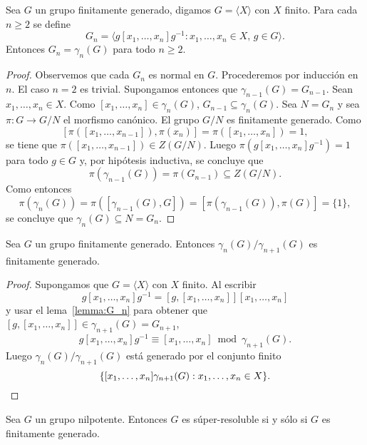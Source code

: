 \begin{lemma}
	\label{lemma:G_n}
	Sea $G$ un grupo finitamente generado, digamos $G=\langle X\rangle$ con $X$
	finito. Para cada $n\geq2$ se define
	\[
		G_n=\langle g[x_1,\dots,x_n]g^{-1}:x_1,\dots,x_n\in X,\,g\in G\rangle.
	\]
	Entonces $G_n=\gamma_n(G)$ para todo $n\geq2$. 
\end{lemma}

\begin{proof}
	Observemos que cada $G_n$ es normal en $G$.  Procederemos por inducción en
	$n$. El caso $n=2$ es trivial. Supongamos entonces que
	$\gamma_{n-1}(G)=G_{n-1}$. Sean $x_1,\dots,x_n\in X$. Como
	$[x_1,\dots,x_n]\in\gamma_{n}(G)$, $G_{n-1}\subseteq\gamma_n(G)$. Sea
	$N=G_n$ y sea $\pi\colon G\to G/N$ el morfismo canónico. El grupo $G/N$ es
	finitamente generado. Como
	\[
	[\pi([x_1,\dots,x_{n-1}]),\pi(x_n)]=\pi([x_1,\dots,x_n])=1,
	\]
	se tiene que $\pi([x_1,\dots,x_{n-1}])\in Z(G/N)$. Luego
	$\pi(g[x_1,\dots,x_n]g^{-1})=1$ para todo $g\in G$ y, por hipótesis
	inductiva, 
	se concluye que 
	\[
	\pi(\gamma_{n-1}(G))=\pi(G_{n-1})\subseteq Z(G/N).
	\]
	Como entonces 
	\[
	\pi(\gamma_{n}(G))=\pi([\gamma_{n-1}(G),G])=[\pi(\gamma_{n-1}(G)),\pi(G)]=\{1\},
	\]
	se concluye que $\gamma_n(G)\subseteq N=G_n$.
\end{proof}

\begin{lemma}
	\label{lemma:gamma_n/gamma_n+1}
	Sea $G$ un grupo finitamente generado.  Entonces
	$\gamma_n(G)/\gamma_{n+1}(G)$ es finitamente generado. 
\end{lemma}

\begin{proof}
	Supongamos que $G=\langle X\rangle$ con $X$ finito. 
	Al escribir 
	\[
	g[x_1,\dots,x_n]g^{-1}=[g,[x_1,\dots,x_n]][x_1,\dots,x_n]
	\]
	y usar el lema~\ref{lemma:G_n} para obtener 
	que $[g,[x_1,\dots,x_n]]\in \gamma_{n+1}(G)=G_{n+1}$, 
	\[
	g[x_1,\dots,x_n]g^{-1}\equiv [x_1,\dots,x_n]\bmod \gamma_{n+1}(G). 
	\]
	Luego $\gamma_{n}(G)/\gamma_{n+1}(G)$ está generado por 
	el conjunto finito 
	\[
	\{[x_1,\dots,x_n]\gamma_{n+1}(G):x_1,\dots,x_n\in X\}. \qedhere 
	\]
\end{proof}

\begin{theorem}
	\label{theorem:super=fg}
	Sea $G$ un grupo nilpotente. Entonces $G$ es súper-resoluble si y sólo si
	$G$ es finitamente generado.
\end{theorem}

